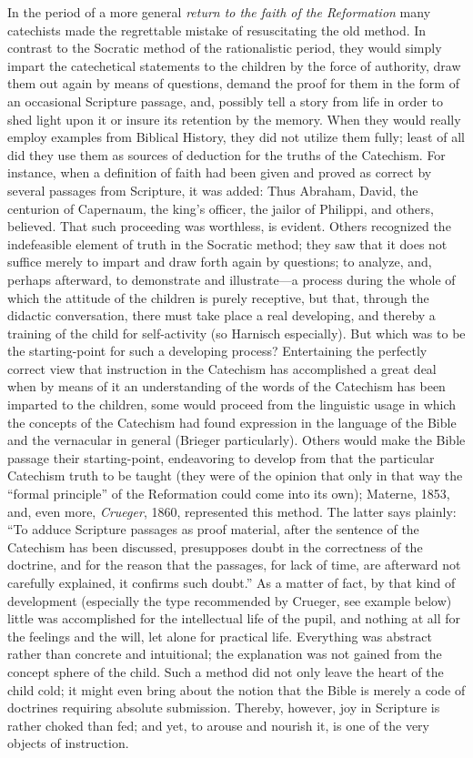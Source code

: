 In the period of a more general \emph{return to the faith of the Reformation} many catechists made the regrettable mistake of resuscitating the old method. In contrast to the Socratic method of the rationalistic period, they would simply impart the catechetical statements to the children by the force of authority, draw them out again by means of questions, demand the proof for them in the form of an occasional Scripture passage, and, possibly tell a story from life in order to shed light upon it or insure its retention by the memory. When they would really employ examples from Biblical History, they did not utilize them fully; least of all did they use them as sources of deduction for the truths of the Catechism. For instance, when a definition of faith had been given and proved as correct by several passages from Scripture, it was added: Thus Abraham, David, the centurion of Capernaum, the king’s officer, the jailor of Philippi, and others, believed. That such proceeding was worthless, is evident. Others recognized the indefeasible element of truth in the Socratic method; they saw that it does not suffice merely to impart and draw forth again by questions; to analyze, and, perhaps afterward, to demonstrate and illustrate—a process during the whole of which the attitude of the children is purely receptive, but that, through the didactic conversation, there must take place a real developing, and thereby a training of the child for self-activity (so Harnisch especially). But which was to be the starting-point for such a developing process? Entertaining the perfectly correct view that instruction in the Catechism has accomplished a great deal when by means of it an understanding of the words of the Catechism has been imparted to the children, some would proceed from the linguistic usage in which the concepts of the Catechism had found expression in the language of the Bible and the vernacular in general (Brieger
particularly). Others would make the Bible passage their starting-point, endeavoring to develop from that the particular Catechism truth to be taught (they were of the opinion that only in that way the “formal principle” of the Reformation could come into its own); Materne, 1853, and, even more, \emph{Crueger}, 1860, represented this method. The latter says plainly: “To adduce Scripture passages as proof material, after the sentence of the Catechism has been discussed, presupposes doubt in the correctness of the doctrine, and for the reason that the passages, for lack of time, are afterward not carefully explained, it confirms such doubt.” As a matter of fact, by that kind of development (especially the type recommended by Crueger, see example below) little was accomplished for the intellectual life of the pupil, and nothing at all for the feelings and the will, let alone for practical life. Everything was abstract rather than concrete and intuitional; the explanation was not gained from the concept sphere of the child. Such a method did not only leave the heart of the child cold; it might even bring about the notion that the Bible is merely a code of doctrines requiring absolute submission. Thereby, however, joy in Scripture is rather choked than fed; and yet, to arouse and nourish it, is one of the very objects of instruction.

